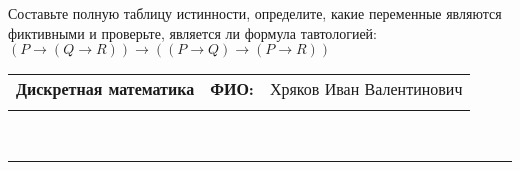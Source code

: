 \documentclass[10pt]{exam}
\newcommand{\class}{Дискретная математика}
\newcommand{\examdate}{}
\begin{document}
\begin{questions}
\begin{enumerate}[a)]
\end{enumerate}\question Составьте полную таблицу истинности, определите, какие переменные являются фиктивными и проверьте, является ли формула тавтологией:
$(P \rightarrow (Q \rightarrow R)) \rightarrow ((P \rightarrow Q) \rightarrow (P \rightarrow R))$

\end{questions}
\newpage
\begin{flushright}
\begin{tabular}{p{2.8in} r l}
\textbf{\class} & \textbf{ФИО:} &Хряков Иван Валентинович
\\

\textbf{\examdate} &&\\
\end{tabular}\\
\end{flushright}
\rule[1ex]{\textwidth}{.1pt}
\end{document}
